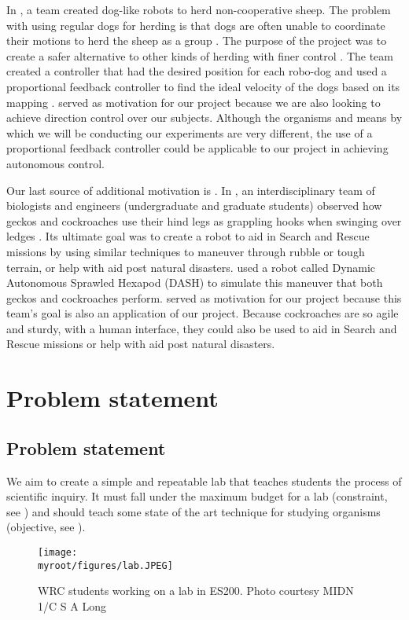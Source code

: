 \documentclass[twocolumn,10pt]{IEEEtran}
\newcommand{\myroot}{.}
\begin{document}
In \cite{pierson2015bioinspired}, a team created dog-like robots to herd non-cooperative sheep. The problem with using regular dogs for herding is that dogs are often unable to coordinate their motions to herd the sheep as a group \cite{pierson2015bioinspired}. The purpose of the project was to create a safer alternative to other kinds of herding with finer control \cite{pierson2015bioinspired}. The team created a controller that had the desired position for each robo-dog and used a proportional feedback controller to find the ideal velocity of the dogs based on its mapping \cite{pierson2015bioinspired}. \cite{pierson2015bioinspired} served as motivation for our project because we are also looking to achieve direction control over our subjects. Although the organisms and means by which we will be conducting our experiments are very different, the use of a proportional feedback controller could be applicable to our project in achieving autonomous control. 

Our last source of additional motivation is \cite{mongeau2012rapid}. In \cite{mongeau2012rapid}, an interdisciplinary team of biologists and engineers (undergraduate and graduate students)  observed how geckos and cockroaches use their hind legs as grappling hooks when swinging over ledges \cite{mongeau2012rapid}. Its ultimate goal was to create a robot to aid in Search and Rescue missions by using similar techniques to maneuver through rubble or tough terrain, or help with aid post natural disasters. \cite{mongeau2012rapid} used  a robot called Dynamic Autonomous Sprawled Hexapod (DASH) to simulate this maneuver that both geckos and cockroaches perform. \cite{mongeau2012rapid} served as motivation for our project because this team's goal is also an application of our project. Because cockroaches are so agile and sturdy, with a human interface, they could also be used to aid in Search and Rescue missions or help with aid post natural disasters.

\section{Problem statement}
\subsection{Problem statement}
We aim to create a simple and repeatable lab that teaches students the process of scientific inquiry. It must fall under the maximum budget for a lab (constraint, see \label{subsec:constraints}) and should teach some state of the art technique for studying organisms (objective, see \label{subsec:objectives}).
\begin{figure}[ht!]
\centering
\texttt{[image: \\myroot/figures/lab.JPEG]}
\caption{WRC students working on a lab in ES200. Photo courtesy MIDN 1/C S A Long}
\label{fig:hollywood}
\end{figure}
\end{document}
